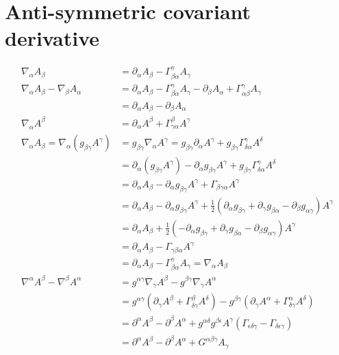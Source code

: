 \documentclass[11pt]{article}
\begin{document}
\section{Anti-symmetric covariant derivative}
\begin{equation}
\begin{aligned}
\nabla_\alpha A_\beta &= \partial_\alpha A_\beta - \Gamma^\gamma_{\beta\alpha} A_\gamma  \\
\nabla_\alpha A_\beta - \nabla_\beta A_\alpha &= \partial_\alpha A_\beta - \Gamma^\gamma_{\beta\alpha} A_\gamma -\partial_\beta A_\alpha + \Gamma^\gamma_{\alpha\beta} A_\gamma  \\
&= \partial_\alpha A_\beta -\partial_\beta A_\alpha  \\
\nabla_\alpha A^\beta &= \partial_\alpha A^\beta + \Gamma^\beta_{\gamma\alpha} A^\gamma  \\
\nabla_\alpha A_\beta = \nabla_\alpha ( g_{\beta\gamma} A^\gamma) &= g_{\beta\gamma} \nabla_\alpha A^\gamma = g_{\beta\gamma} \partial_\alpha A^\gamma + g_{\beta\gamma} \Gamma^\gamma_{\delta\alpha} A^\delta \\
&= \partial_\alpha (g_{\beta\gamma} A^\gamma) - \partial_\alpha g_{\beta\gamma} A^\gamma + g_{\beta\gamma} \Gamma^\gamma_{\delta\alpha} A^\delta \\
&= \partial_\alpha A_\beta - \partial_\alpha g_{\beta\gamma} A^\gamma +  \Gamma_{\beta\gamma\alpha} A^\gamma \\
&= \partial_\alpha A_\beta - \partial_\alpha g_{\beta\gamma} A^\gamma +  \frac{1}{2} (\partial_\alpha g_{\beta\gamma} + \partial_\gamma g_{\beta\alpha} - \partial_\beta g_{\alpha\gamma}) A^\gamma \\
&= \partial_\alpha A_\beta +  \frac{1}{2} ( - \partial_\alpha g_{\beta\gamma} + \partial_\gamma g_{\beta\alpha} - \partial_\beta g_{\alpha\gamma}) A^\gamma \\
&= \partial_\alpha A_\beta - \Gamma_{\gamma\beta\alpha} A^\gamma \\
&= \partial_\alpha A_\beta - \Gamma^\gamma_{\beta\alpha} A_\gamma = \nabla_\alpha A_\beta \\
\nabla^\alpha A^\beta - \nabla^\beta A^\alpha &= g^{\alpha\gamma} \nabla_\gamma A^\beta - g^{\beta\gamma} \nabla_\gamma A^\alpha \\
&= g^{\alpha\gamma} (\partial_\gamma A^\beta + \Gamma^\beta_{\delta\gamma} A^\delta) - g^{\beta\gamma} (\partial_\gamma A^\alpha + \Gamma^\alpha_{\delta\gamma} A^\delta) \\
&= \partial^\alpha A^\beta - \partial^\beta A^\alpha + g^{\alpha\delta} g^{\beta\epsilon} A^\gamma( \Gamma_{\epsilon\delta\gamma} - \Gamma_{\delta\epsilon\gamma}) \\
&= \partial^\alpha A^\beta - \partial^\beta A^\alpha + G^{\alpha\beta\gamma} A_\gamma \\
\end{aligned}
\end{equation}



\begin{thebibliography}{0}
	
\end{thebibliography}
\end{document}
